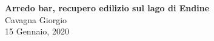 \begin{titlepage}
    \begin{center}
		\vspace*{\fill}

		\vspace{2cm}
        \Huge\textbf{Arredo bar, recupero edilizio sul lago di Endine}\\
        
        \vspace{4cm}
        \vspace{1.5cm}
        \Large{Cavagna Giorgio}\\
        \vspace{0.5cm}
        \vspace{0.5cm}
        \large{15 Gennaio, 2020}
        \vspace*{\fill}
    \end{center}  
\end{titlepage}


